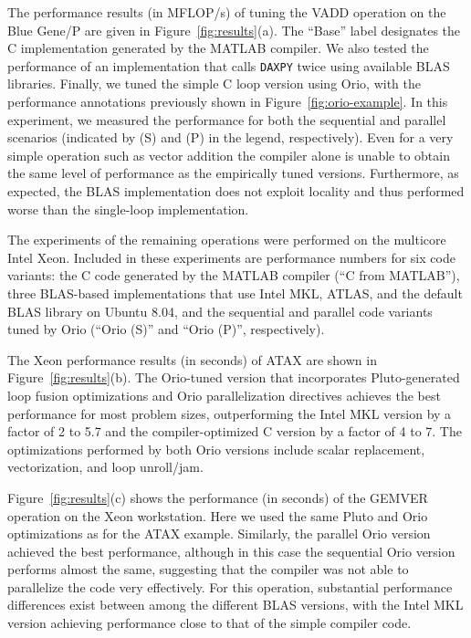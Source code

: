 \documentclass[runningheads]{llncs}
\begin{document}
The performance results (in MFLOP/s) of tuning the VADD operation on the Blue
Gene/P are given in Figure~\ref{fig:results}(a). The ``Base'' label
designates the C implementation generated by the MATLAB compiler. We also
tested the performance of an implementation that calls
\texttt{DAXPY} twice using available BLAS libraries.
Finally, we tuned the simple C loop version using Orio, with the performance
annotations previously shown in Figure~\ref{fig:orio-example}. In this
experiment, we measured the performance for both the sequential and parallel
scenarios (indicated by (S) and (P) in the legend, respectively). Even for a very simple operation such as vector addition the
compiler alone is unable to obtain the same level of performance as the
empirically tuned versions. Furthermore, as expected, the BLAS implementation
does not exploit locality and thus performed worse than the single-loop
implementation.

The experiments of the remaining operations were performed on the
multicore Intel Xeon. Included in these experiments are performance
numbers for six code variants: the C code generated by the MATLAB
compiler (``C from MATLAB''), three BLAS-based implementations that
use Intel MKL, ATLAS, and the default BLAS library on Ubuntu 8.04, and
the sequential and parallel code variants tuned by Orio (``Orio
(S)'' and ``Orio (P)'', respectively).

The Xeon performance results (in seconds) of ATAX are shown in
Figure~\ref{fig:results}(b). The Orio-tuned version that incorporates
Pluto-generated loop fusion optimizations and Orio parallelization
directives achieves the best performance for most problem sizes,
outperforming the Intel MKL version by a factor of 2 to 5.7 and the
compiler-optimized C version by a factor of 4 to 7. The optimizations
performed by both Orio versions include scalar replacement,
vectorization, and loop unroll/jam.

Figure~\ref{fig:results}(c) shows the performance (in seconds) of the GEMVER
operation on the Xeon workstation. Here we used the same Pluto and Orio
optimizations as for the ATAX example. Similarly, the parallel Orio version
achieved the best performance, although in this case the sequential Orio
version performs almost the same, suggesting that the compiler was not able
to parallelize the code very effectively. For this operation, substantial
performance differences exist between among the different BLAS versions, with
the Intel MKL version achieving performance close to that of the simple
compiler code.
\end{document}
